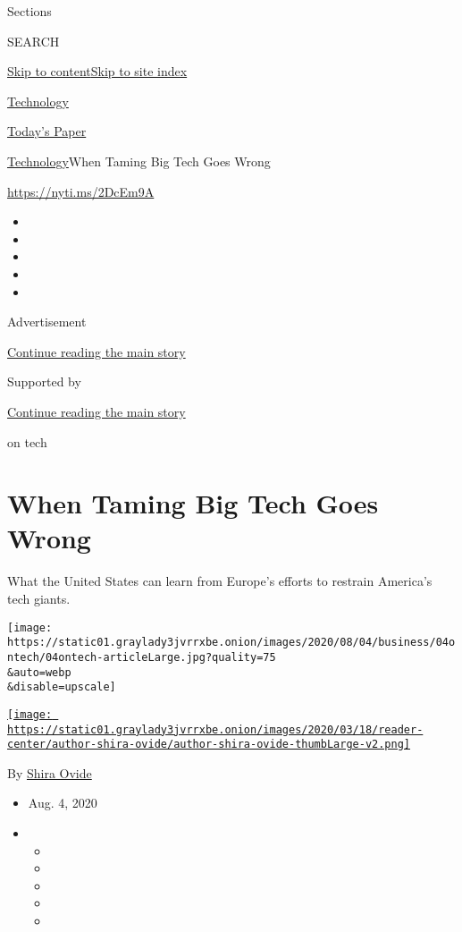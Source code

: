 Sections

SEARCH

\protect\hyperlink{site-content}{Skip to
content}\protect\hyperlink{site-index}{Skip to site index}

\href{https://www.nytimes3xbfgragh.onion/section/technology}{Technology}

\href{https://myaccount.nytimes3xbfgragh.onion/auth/login?response_type=cookie\&client_id=vi}{}

\href{https://www.nytimes3xbfgragh.onion/section/todayspaper}{Today's
Paper}

\href{/section/technology}{Technology}\textbar{}When Taming Big Tech
Goes Wrong

\url{https://nyti.ms/2DcEm9A}

\begin{itemize}
\item
\item
\item
\item
\item
\end{itemize}

Advertisement

\protect\hyperlink{after-top}{Continue reading the main story}

Supported by

\protect\hyperlink{after-sponsor}{Continue reading the main story}

on tech

\hypertarget{when-taming-big-tech-goes-wrong}{%
\section{When Taming Big Tech Goes
Wrong}\label{when-taming-big-tech-goes-wrong}}

What the United States can learn from Europe's efforts to restrain
America's tech giants.

\texttt{[image: https://static01.graylady3jvrrxbe.onion/images/2020/08/04/business/04ontech/04ontech-articleLarge.jpg?quality=75\\\&auto=webp\\\&disable=upscale]}

\href{https://www.nytimes3xbfgragh.onion/by/shira-ovide}{\texttt{[image: https://static01.graylady3jvrrxbe.onion/images/2020/03/18/reader-center/author-shira-ovide/author-shira-ovide-thumbLarge-v2.png]}}

By \href{https://www.nytimes3xbfgragh.onion/by/shira-ovide}{Shira Ovide}

\begin{itemize}
\item
  Aug. 4, 2020
\item
  \begin{itemize}
  \item
  \item
  \item
  \item
  \item
  \end{itemize}
\end{itemize}

